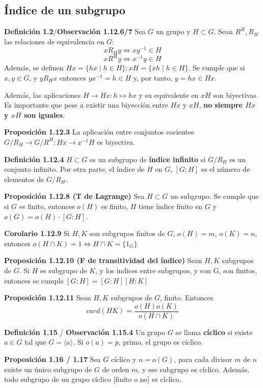 \documentclass[a4paper, 11pt]{extarticle}
\newcommand{\propo}[1]{\textcolor{rojo}{\textbf{Proposición #1}}}
\newcommand{\defi}[1]{\textcolor{azul}{\textbf{Definición #1}}}
\newcommand{\obs}[1]{\textcolor{verde}{\textbf{Observación #1}}}
\newcommand{\cor}[1]{\textcolor{rosa}{\textbf{Corolario #1}}}
\begin{document}
\subsection{Índice de un subgrupo}
\label{sec:org2a1e17e}
\defi{1.2}/\obs{1.12.6/7} Sea \(G\) un grupo y \(H \subset G\).  Sean \(R^H, R_H\) las relaciones de equivalencia en \(G\):
\[ xR_H y \iff xy^{-1} \in H \]
\[ xR^H y \iff x^{-1}y \in H \]
Además, se definen \(Hx = \{ hx \;|\; h \in H \}; xH = \{ xh \;|\; h \in H \}\).
Se cumple que si \(x,y \in G\), y \(yR_H x\) entonces \(yx^{-1} = h \in H\) y,
por tanto, \(y = hx \in Hx\).

Además, las aplicaciones \(H \rightarrow Hx: h \mapsto hx\) y su equivalente en \(xH\) son
biyectivas. Es importante que pese a existir una biyeccíón entre
 \(Hx\) y \(xH\), \textbf{no siempre \(Hx\) y \(xH\) son iguales}.

\propo{1.12.3} La aplicación entre conjuntos cocientes
 \(G/R_H \rightarrow G/R^H: Hx \rightarrow x^{-1}H\) es biyectiva.

\defi{1.12.4} \(H \subset G\) es un subgrupo de \textbf{índice infinito} si \(G/R_H\) es
un conjunto infinito. Por otra parte, el índice de \(H\) en \(G\), \([G:H]\) es
 el número de elementos de \(G/R_H\).

\propo{1.12.8 (T de Lagrange)} Sea \(H \subset G\) un subgrupo. Se cumple que 
si \(G\) es finito, entonces \(o(H)\) es
finito, \(H\) tiene índice finito en \(G\) y \(o(G) = o(H) \cdot [G:H]\).

\cor{1.12.9} Si \(H,K\) son subgrupos finitos de \(G\), \(o(H) = m\), \(o(K) = n\), 
entonces \(o(H \cap K) = 1 \iff H \cap K = \{ 1_G \}\)

\propo{1.12.10 (F de transitividad del índice)} Sean \(H,K\) 
subgrupos de \(G\). Si \(H\) es subgrupo de \(K\), y los indices entre subgrupos, y con G,
son finitos, entonces se cumple \([G:H] = [G:H][H:K]\)

\propo{1.12.11} Sean \(H,K\) subgrupos de \(G\), finito. Entonces
\[ card(HK) = \frac{o(H)o(K)}{o(H \cap K)} \]


\defi{1.15} / \obs{1.15.4} Un grupo \(G\) se llama \textbf{cíclico} si existe
 \(a \in G\) tal que \(G
= \langle a \rangle\). Si \(o(a) = p\), primo, el grupo es cíclico.

\propo{1.16 / 1.17} Sea \(G\) cíclico y \(n = o(G)\), para cada divisor \(m\) de
\(n\)
existe un único subgrupo de \(G\) de orden \(m\), y ese subgrupo es cíclico.
Además, todo subgrupo de un grupo cíclico [finito o no] es cíclico.
\end{document}
